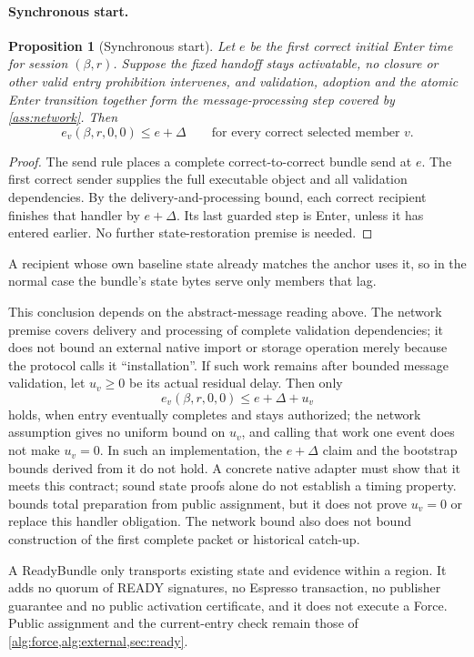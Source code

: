 \documentclass[11pt,a4paper]{article}
\newtheorem{proposition}[proposition]{Proposition}
\newcounter{protocol}
\begin{document}
\paragraph{Synchronous start.}
\begin{proposition}[Synchronous start]
\label{prop:sync-start}
Let $e$ be the first correct initial Enter time for session
$(\beta,r)$. Suppose the fixed handoff stays activatable, no closure or
other valid entry prohibition intervenes, and validation, adoption and
the atomic Enter transition together form the message-processing step
covered by \cref{ass:network}. Then
\[
 e_v(\beta,r,0,0)\le e+\Delta
 \qquad\text{for every correct selected member }v.
\]
\end{proposition}
\begin{proof}
The send rule places a complete correct-to-correct bundle send at $e$.
The first correct sender supplies the full executable object and all
validation dependencies. By the delivery-and-processing bound, each
correct recipient finishes that handler by $e+\Delta$. Its last guarded
step is Enter, unless it has entered earlier. No further
state-restoration premise is needed.
\end{proof}
A recipient whose own baseline state already matches the anchor uses
it, so in the normal case the bundle's state bytes serve only members
that lag.


This conclusion depends on the abstract-message reading above. The
network premise covers delivery and processing of complete validation
dependencies; it does not bound an external native import or storage
operation merely because the protocol calls it ``installation''. If such
work remains after bounded message validation, let $u_v\ge0$ be its
actual residual delay. Then only
\[
 e_v(\beta,r,0,0)\le e+\Delta+u_v
\]
holds, when entry eventually completes and stays authorized; the network
assumption gives no uniform bound on $u_v$, and calling that work one
event does not make $u_v=0$. In such an implementation, the $e+\Delta$
claim and the bootstrap bounds derived from it do not hold. A concrete
native adapter must show that it meets this contract; sound state proofs
alone do not establish a timing property.  bounds
total preparation from public assignment, but it does not prove $u_v=0$
or replace this handler obligation. The network bound also does not
bound construction of the first complete packet or historical catch-up.

A ReadyBundle only transports existing state and evidence within a
region. It adds no quorum of READY signatures, no Espresso transaction,
no publisher guarantee and no public activation certificate, and it does
not execute a Force. Public assignment and the current-entry check remain
those of \cref{alg:force,alg:external,sec:ready}.
\end{document}
